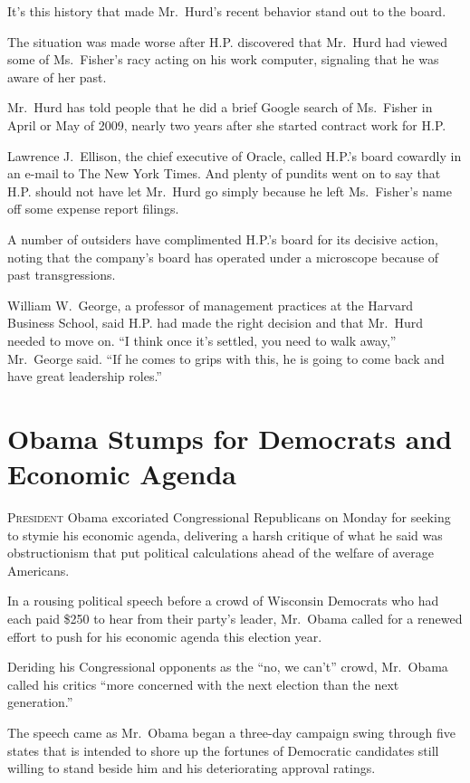 ﻿\documentclass[12pt]{article}
\begin{document}
It's this history that made Mr.~Hurd's recent behavior stand out to the board.

The situation was made worse after H.P. discovered that Mr.~Hurd had viewed some of Ms.~Fisher's
racy acting on his work computer, signaling that he was aware of her past.

Mr.~Hurd has told people that he did a brief Google search of Ms.~Fisher in April or May of 2009,
nearly two years after she started contract work for H.P.

Lawrence J.~Ellison, the chief executive of Oracle, called H.P.'s board cowardly in an e-mail to The
New York Times. And plenty of pundits went on to say that H.P. should not have let Mr.~Hurd go
simply because he left Ms.~Fisher's name off some expense report filings.

A number of outsiders have complimented H.P.'s board for its decisive action, noting that the
company's board has operated under a microscope because of past transgressions.

William W.~George, a professor of management practices at the Harvard Business School, said H.P. had
made the right decision and that Mr.~Hurd needed to move on. ``I think once it's settled, you need
to walk away,'' Mr.~George said. ``If he comes to grips with this, he is going to come back and have
great leadership roles.''

\section{Obama Stumps for Democrats and Economic Agenda}

\lettrine{P}{resident} Obama excoriated Congressional Republicans on Monday
for seeking to stymie his economic agenda, delivering a harsh critique of what he said was
obstructionism that put political calculations ahead of the welfare of average Americans.

In a rousing political speech before a crowd of Wisconsin Democrats who had each paid \$250 to hear
from their party's leader, Mr.~Obama called for a renewed effort to push for his economic agenda
this election year.

Deriding his Congressional opponents as the ``no, we can't'' crowd, Mr.~Obama called his critics
``more concerned with the next election than the next generation.''

The speech came as Mr.~Obama began a three-day campaign swing through five states that is intended
to shore up the fortunes of Democratic candidates still willing to stand beside him and his
deteriorating approval ratings.
\end{document}
